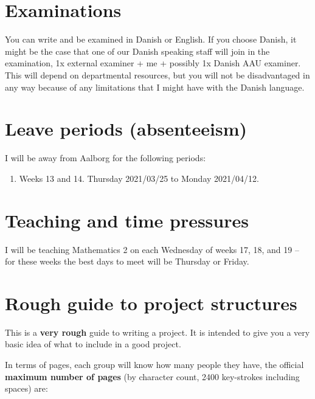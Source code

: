 \documentclass[
]{book}
\providecommand{\tightlist}{%
  \setlength{\itemsep}{0pt}\setlength{\parskip}{0pt}}
\begin{document}
\hypertarget{examinations}{%
\section{Examinations}\label{examinations}}

You can write and be examined in Danish or English. If you choose
Danish, it might be the case that one of our Danish speaking staff will
join in the examination, 1x external examiner + me + possibly 1x Danish
AAU examiner. This will depend on departmental resources, but you will
not be disadvantaged in any way because of any limitations that I might
have with the Danish language.

\hypertarget{leave-periods-absenteeism}{%
\section{Leave periods (absenteeism)}\label{leave-periods-absenteeism}}

I will be away from Aalborg for the following periods:

\begin{enumerate}
\def\labelenumi{\arabic{enumi}.}
\tightlist
\item
  Weeks 13 and 14. Thursday 2021/03/25 to Monday 2021/04/12.
\end{enumerate}

\hypertarget{teaching-and-time-pressures}{%
\section{Teaching and time pressures}\label{teaching-and-time-pressures}}

I will be teaching Mathematics 2 on each Wednesday of weeks 17, 18, and
19 -- for these weeks the best days to meet will be Thursday or Friday.

\hypertarget{rough-guide-to-project-structures}{%
\section{Rough guide to project structures}\label{rough-guide-to-project-structures}}

This is a \textbf{very rough} guide to writing a project. It is intended to
give you a very basic idea of what to include in a good project.

In terms of pages, each group will know how many people they have, the
official \textbf{maximum number of pages} (by character count, 2400
key-strokes including spaces) are:
\end{document}
